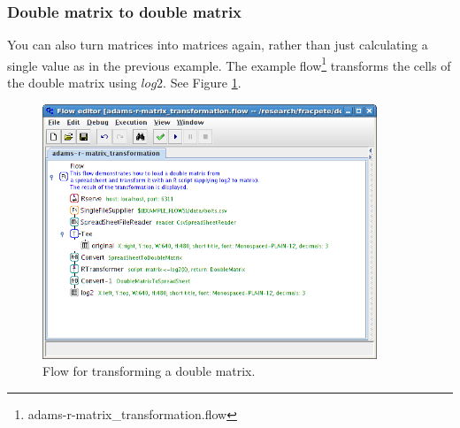 \documentclass[a4paper]{book}
\begin{document}
\clearpage
\subsubsection{Double matrix to double matrix}
You can also turn matrices into matrices again, rather than just calculating a 
single value as in the previous example. The example
flow\footnote{adams-r-matrix\_transformation.flow} transforms the cells
of the double matrix using $log2$. See Figure \ref{matrix_transformation-flow}.
\begin{figure}[ht]
	\centering
	\includegraphics[width=10cm]{images/matrix_transformation-flow.png}
	\caption{Flow for transforming a double matrix.}
	\label{matrix_transformation-flow}
\end{figure}

\clearpage
\end{document}
